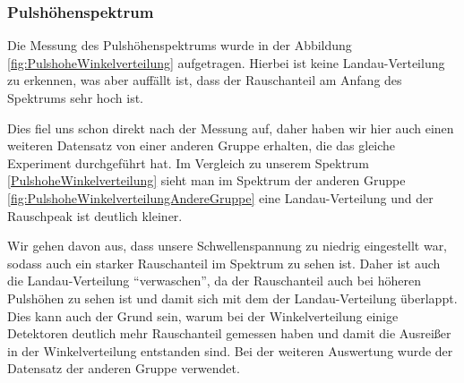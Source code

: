 \documentclass{article}
\begin{document}
\subsubsection*{Pulshöhenspektrum}
Die Messung des Pulshöhenspektrums wurde in der Abbildung \ref{fig:PulshoheWinkelverteilung} aufgetragen.
Hierbei ist keine Landau-Verteilung zu erkennen, was aber auffällt ist, dass der Rauschanteil am Anfang des Spektrums sehr hoch ist.

Dies fiel uns schon direkt nach der Messung auf, daher haben wir hier auch einen weiteren Datensatz von einer anderen Gruppe erhalten, die das gleiche Experiment durchgeführt hat.
Im Vergleich zu unserem Spektrum \ref{PulshoheWinkelverteilung} sieht man im Spektrum der anderen Gruppe \ref{fig:PulshoheWinkelverteilungAndereGruppe} eine Landau-Verteilung und der Rauschpeak
ist deutlich kleiner.

Wir gehen davon aus, dass unsere Schwellenspannung zu niedrig eingestellt war, sodass auch ein starker Rauschanteil im Spektrum zu sehen ist. Daher ist auch die Landau-Verteilung \enquote{verwaschen}, da der Rauschanteil auch
bei höheren Pulshöhen zu sehen ist und damit sich mit dem der Landau-Verteilung überlappt.
Dies kann auch der Grund sein, warum bei der Winkelverteilung einige Detektoren deutlich mehr Rauschanteil gemessen haben und damit die Ausreißer in der Winkelverteilung entstanden sind.
Bei der weiteren Auswertung wurde der Datensatz der anderen Gruppe verwendet.
\end{document}
